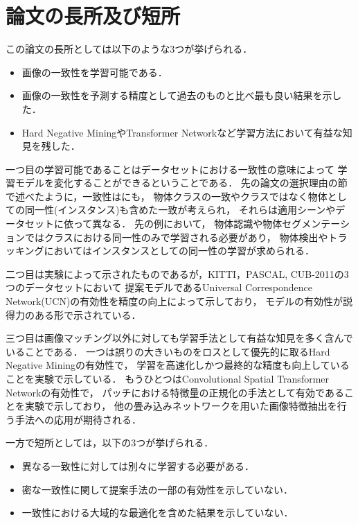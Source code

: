 \section{論文の長所及び短所}

この論文の長所としては以下のような3つが挙げられる．

\begin{itemize}
  \item 画像の一致性を学習可能である．
  \item 画像の一致性を予測する精度として過去のものと比べ最も良い結果を示した．
  \item Hard Negative MiningやTransformer Networkなど学習方法において有益な知見を残した．
\end{itemize}

一つ目の学習可能であることはデータセットにおける一致性の意味によって
学習モデルを変化することができるということである．
先の論文の選択理由の節で述べたように，一致性はにも，
物体クラスの一致やクラスではなく物体としての同一性(インスタンス)も含めた一致が考えられ，
それらは適用シーンやデータセットに依って異なる．
先の例において，
物体認識や物体セグメンテーションではクラスにおける同一性のみで学習される必要があり，
物体検出やトラッキングにおいてはインスタンスとしての同一性の学習が求められる．

二つ目は実験によって示されたものであるが，KITTI，PASCAL, CUB-2011の3つのデータセットにおいて
提案モデルであるUniversal Correspondence Network(UCN)の有効性を精度の向上によって示しており，
モデルの有効性が説得力のある形で示されている．

三つ目は画像マッチング以外に対しても学習手法として有益な知見を多く含んでいることである．
一つは誤りの大きいものをロスとして優先的に取るHard Negative Miningの有効性で，
学習を高速化しかつ最終的な精度も向上していることを実験で示している．
もうひとつはConvolutional Spatial Transformer Networkの有効性で，
パッチにおける特徴量の正規化の手法として有効であることを実験で示しており，
他の畳み込みネットワークを用いた画像特徴抽出を行う手法への応用が期待される．

一方で短所としては，以下の3つが挙げられる．

\begin{itemize}
  \item 異なる一致性に対しては別々に学習する必要がある．
  \item 密な一致性に関して提案手法の一部の有効性を示していない．
  \item 一致性における大域的な最適化を含めた結果を示していない．
\end{itemize}

